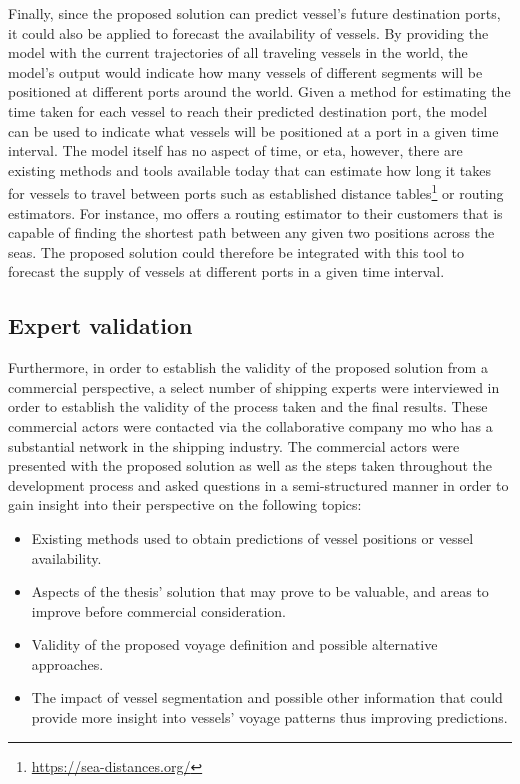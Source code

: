Finally, since the proposed solution can predict vessel's future destination ports, it could also be applied to forecast the availability of vessels. By providing the model with the current trajectories of all traveling vessels in the world, the model's output would indicate how many vessels of different segments will be positioned at different ports around the world. Given a method for estimating the time taken for each vessel to reach their predicted destination port, the model can be used to indicate what vessels will be positioned at a port in a given time interval. The model itself has no aspect of time, or \acrshort{eta}, however, there are existing methods and tools available today that can estimate how long it takes for vessels to travel between ports such as established distance tables\footnote{\url{https://sea-distances.org/}} or routing estimators. For instance, \acrfull{mo} offers a routing estimator to their customers that is capable of finding the shortest path between any given two positions across the seas. The proposed solution could therefore be integrated with this tool to forecast the supply of vessels at different ports in a given time interval.

\subsection{Expert validation}

Furthermore, in order to establish the validity of the proposed solution from a commercial perspective, a select number of shipping experts were interviewed in order to establish the validity of the process taken and the final results. These commercial actors were contacted via the collaborative company \acrfull{mo} who has a substantial network in the shipping industry. The commercial actors were presented with the proposed solution as well as the steps taken throughout the development process and asked questions in a semi-structured manner in order to gain insight into their perspective on the following topics:

\begin{itemize}
    \item Existing methods used to obtain predictions of vessel positions or vessel availability.
    \item Aspects of the thesis' solution that may prove to be valuable, and areas to improve before commercial consideration.
    \item Validity of the proposed voyage definition and possible alternative approaches.
    \item The impact of vessel segmentation and possible other information that could provide more insight into vessels' voyage patterns thus improving predictions.
\end{itemize}

